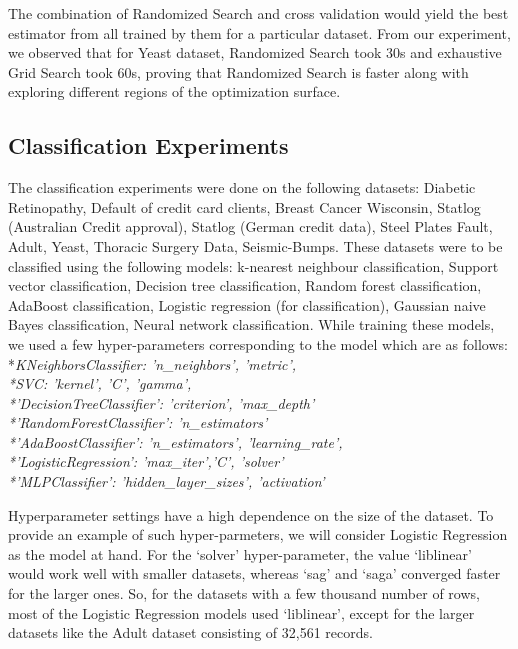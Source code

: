 \documentclass[10pt,twocolumn,letterpaper]{article}
\begin{document}
The combination of Randomized Search and cross validation would yield the best estimator from all trained by them for a particular dataset. From our experiment, we observed that for Yeast dataset, Randomized Search took 30s and exhaustive Grid Search took 60s, proving that Randomized Search is faster along with exploring different regions of the optimization surface.


\subsection{Classification Experiments}

The classification experiments were done on the following datasets:
Diabetic Retinopathy, Default of credit card clients, Breast Cancer Wisconsin, Statlog (Australian Credit approval), Statlog (German credit data), Steel Plates Fault, Adult, Yeast, Thoracic Surgery Data, Seismic-Bumps.
These datasets were to be classified using the following models:
k-nearest neighbour classification, Support vector classification, Decision tree classification, Random forest classification, AdaBoost classification, Logistic regression (for classification), Gaussian naive Bayes classification, Neural network classification.
While training these models, we used a few hyper-parameters corresponding to the model which are as follows: 
\\*\textit{KNeighborsClassifier: 'n\_neighbors', 'metric',
\\*SVC: 'kernel', 'C', 'gamma',
\\*'DecisionTreeClassifier': 'criterion', 'max\_depth'
\\*'RandomForestClassifier': 'n\_estimators'
 \\*'AdaBoostClassifier': 'n\_estimators', 'learning\_rate',
  \\*'LogisticRegression': 'max\_iter','C', 'solver'
    \\*'MLPClassifier': 'hidden\_layer\_sizes', 'activation'}
    
Hyperparameter settings have a high dependence on the size of the dataset. To provide an example of such hyper-parmeters, we will consider Logistic Regression as the model at hand. For the ‘solver’ hyper-parameter, the value ‘liblinear’ would work well with smaller datasets, whereas ‘sag’ and ‘saga’ converged faster for the larger ones. So, for the datasets with a few thousand number of rows, most of the Logistic Regression models used ‘liblinear’, except for the larger datasets like the Adult dataset consisting of 32,561 records.
\end{document}
